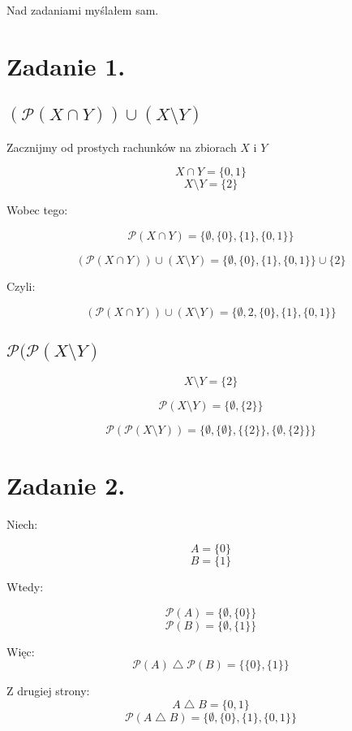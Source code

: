 \documentclass{article}
\begin{document}
\newcommand{\imp}{\Rightarrow}
\newcommand{\lub}{\vee}
\newcommand{\roz}{\setminus}
\newcommand{\zbp}{\emptyset}
\newcommand{\zbpot}{\mathcal{P}}
\newcommand{\troj}{\bigtriangleup}

\maketitle
Nad zadaniami myślałem sam.
\section*{Zadanie 1.}

\subsection*{$(\zbpot ( X \cap Y)) \cup (X \roz Y)$}
Zacznijmy od prostych rachunków na zbiorach $X$ i $Y$

\[X\cap Y = \{0,1\}\]
\[X\roz Y = \{2\}\]

Wobec tego:

\[\zbpot ( X \cap Y) = \{\zbp, \{0\}, \{1\}, \{0,1\}\} \]

\[(\zbpot ( X \cap Y)) \cup (X \roz Y) = \{\zbp, \{0\}, \{1\}, \{0,1\}\} \cup \{2\} \]

Czyli:

\[(\zbpot ( X \cap Y)) \cup (X \roz Y) = \{\zbp, 2, \{0\}, \{1\}, \{0,1\}\}  \]

\subsection*{$\zbpot (\zbpot(X\roz Y)$}

\[X\roz Y = \{2\}\]

\[\zbpot (X\roz Y) = \{\zbp,\{2\}\}\]

\[\zbpot (\zbpot (X\roz Y)) = \{\zbp, \{\zbp\},\{\{2\}\}, \{\zbp,\{2\}\}\}\]


\section*{Zadanie 2.}

Niech:

\[A = \{0\}\]
\[B = \{1\}\]

Wtedy:

\[\zbpot (A) = \{\zbp,\{0\}\}\]
\[\zbpot (B) = \{\zbp,\{1\}\}\]

Więc:
\[ \zbpot (A) \troj \zbpot (B) = \{\{0\},\{1\}\} \]

Z drugiej strony:
\[A \troj B = \{0,1\}\]
\[\zbpot (A\troj B) = \{\zbp,\{0\},\{1\},\{0,1\}\}\]
\end{document}
